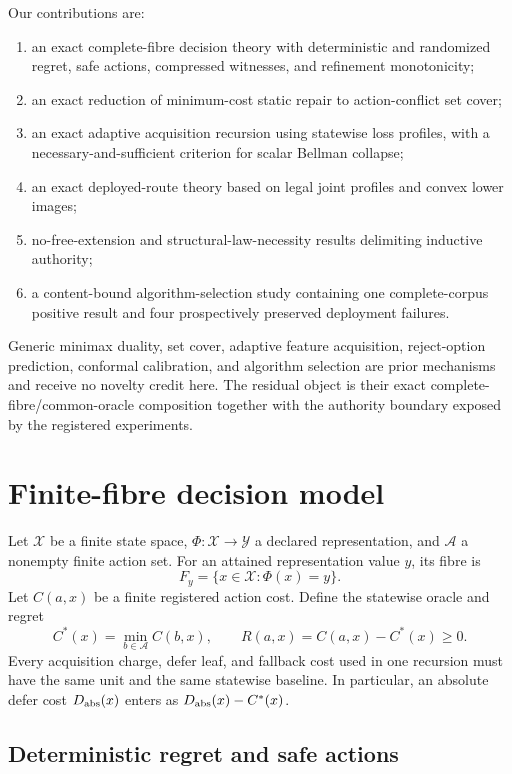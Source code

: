 \documentclass[11pt]{article}
\theoremstyle{definition}
\theoremstyle{remark}
\newcommand{\X}{\mathcal X}
\newcommand{\A}{\mathcal A}
\begin{document}
Our contributions are:
\begin{enumerate}
  \item an exact complete-fibre decision theory with deterministic and randomized regret, safe actions, compressed witnesses, and refinement monotonicity;
  \item an exact reduction of minimum-cost static repair to action-conflict set cover;
  \item an exact adaptive acquisition recursion using statewise loss profiles, with a necessary-and-sufficient criterion for scalar Bellman collapse;
  \item an exact deployed-route theory based on legal joint profiles and convex lower images;
  \item no-free-extension and structural-law-necessity results delimiting inductive authority;
  \item a content-bound algorithm-selection study containing one complete-corpus positive result and four prospectively preserved deployment failures.
\end{enumerate}

Generic minimax duality, set cover, adaptive feature acquisition, reject-option prediction, conformal calibration, and algorithm selection are prior mechanisms and receive no novelty credit here.  The residual object is their exact complete-fibre/common-oracle composition together with the authority boundary exposed by the registered experiments.



\section{Finite-fibre decision model}

Let $\X$ be a finite state space, $\Phi:\X\to\mathcal Y$ a declared representation, and $\A$ a nonempty finite action set.  For an attained representation value $y$, its fibre is
\[
  F_y=\{x\in\X:\Phi(x)=y\}.
\]
Let $C(a,x)$ be a finite registered action cost.  Define the statewise oracle and regret
\[
  C^*(x)=\min_{b\in\A} C(b,x),\qquad
  R(a,x)=C(a,x)-C^*(x)\ge 0.
\]
Every acquisition charge, defer leaf, and fallback cost used in one recursion must have the same unit and the same statewise baseline.  In particular, an absolute defer cost $D_{\rm abs}(x)$ enters as $D_{\rm abs}(x)-C^*(x)$.

\subsection{Deterministic regret and safe actions}
\end{document}
